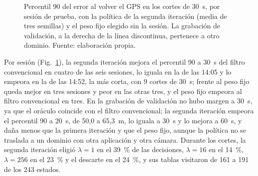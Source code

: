 \begin{figure}[H]
\centering
{}
\caption[Percentil 90 del error a 30~s por sesión de prueba]{Percentil 90 del error al volver el GPS en los cortes de 30~s, por sesión de prueba, con la política de la segunda iteración (media de tres semillas) y el peso fijo elegido sin la sesión. La grabación de validación, a la derecha de la línea discontinua, pertenece a otro dominio. Fuente: elaboración propia.}
\label{fig:res-rl-sesiones}
\end{figure}

Por sesión (Fig.~\ref{fig:res-rl-sesiones}), la segunda iteración mejora el percentil 90 a 30~s del filtro convencional en cuatro de las seis sesiones, lo iguala en la de las 14:05 y lo empeora en la de las 14:52, la más corta, con 9 cortes de 30~s; frente al peso fijo queda mejor en tres sesiones y peor en las otras tres, y el peso fijo empeora al filtro convencional en tres.
En la grabación de validación no hubo margen a 30~s, ya que el oráculo coincide con el filtro convencional; la segunda iteración empeora el percentil 90 a 20~s, de 50,0 a 65,3~m, lo iguala a 30~s y lo mejora a 60~s, y daña menos que la primera iteración y que el peso fijo, aunque la política no se traslada a un dominio con otra aplicación y otra cámara.
Durante los cortes, la segunda iteración eligió $\lambda = 1$ en el 39~\% de las decisiones, $\lambda = 16$ en el 14~\%, $\lambda = 256$ en el 23~\% y el descarte en el 24~\%, y sus tablas visitaron de 161 a 191 de los 243 estados.

